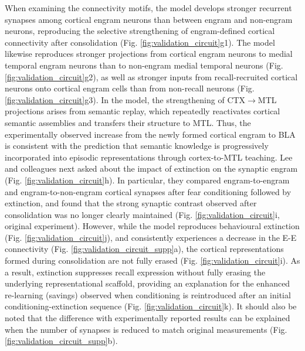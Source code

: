 \documentclass{article}
\begin{document}
When examining the connectivity motifs, the model develops stronger recurrent synapses among cortical engram neurons than between engram and non-engram neurons, reproducing the selective strengthening of engram-defined cortical connectivity after consolidation (Fig. \ref{fig:validation_circuit}g1). The model likewise reproduces stronger projections from cortical engram neurons to medial temporal engram neurons than to non-engram medial temporal neurons (Fig. \ref{fig:validation_circuit}g2), as well as stronger inputs from recall-recruited cortical neurons onto cortical engram cells than from non-recall neurons (Fig. \ref{fig:validation_circuit}g3). In the model, the strengthening of CTX$\rightarrow$MTL projections arises from semantic replay, which repeatedly reactivates cortical semantic assemblies and transfers their structure to MTL. Thus, the experimentally observed increase from the newly formed cortical engram to BLA is consistent with the prediction that semantic knowledge is progressively incorporated into episodic representations through cortex-to-MTL teaching.
\newline\newline
Lee and colleagues next asked about the impact of extinction on the synaptic engram (Fig. \ref{fig:validation_circuit}h). In particular, they compared engram-to-engram and engram-to-non-engram cortical synapses after fear conditioning followed by extinction, and found that the strong synaptic contrast observed after consolidation was no longer clearly maintained (Fig. \ref{fig:validation_circuit}i, original experiment). However, while the model reproduces behavioural extinction (Fig. \ref{fig:validation_circuit}j), and consistently experiences a decrease in the E-E connectivity (Fig. \ref{fig:validation_circuit_supp}a), the cortical representations formed during consolidation are not fully erased (Fig. \ref{fig:validation_circuit}i). As a result, extinction suppresses recall expression without fully erasing the underlying representational scaffold, providing an explanation for the enhanced re-learning (savings) observed when conditioning is reintroduced after an initial conditioning-extinction sequence (Fig. \ref{fig:validation_circuit}k). It should also be noted that the difference with experimentally reported results can be explained when the number of synapses is reduced to match original measurements (Fig. \ref{fig:validation_circuit_supp}b).
\end{document}
